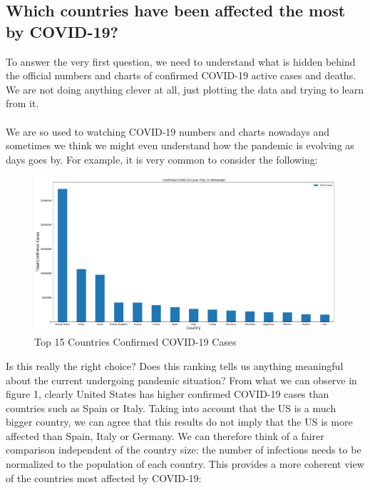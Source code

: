 \documentclass[11pt,a4paper]{article}
\begin{document}
\subsection{Which countries have been affected the most by COVID-19?}
To answer the very first question, we need to understand what is hidden behind
the official numbers and charts of confirmed COVID-19 active cases and deaths.
We are not doing anything clever at all, just plotting the data and trying to
learn from it.\\
\\
We are so used to watching COVID-19 numbers and charts nowadays and sometimes we
think we might even understand how the pandemic is evolving as days goes by. For
example, it is very common to consider the following:
\begin{figure}[H]
    \begin{center}
        \hspace*{-0.2cm}
        \includegraphics[scale=0.32]{img/total-cases.pdf}
    \end{center}
    \caption{Top 15 Countries Confirmed COVID-19 Cases}
\end{figure}
\noindent Is this really the right choice? Does this ranking tells us anything
meaningful about the current undergoing pandemic situation? From what we can
observe in figure 1, clearly United States has higher confirmed COVID-19 cases
than countries such as Spain or Italy. Taking into account that the US is a much
bigger country, we can agree that this results do not imply that the US is more
affected than Spain, Italy or Germany. We can therefore think of a fairer
comparison independent of the country size: the number of infections needs to be
normalized to the population of each country. This provides a more coherent view
of the countries most affected by COVID-19:
\end{document}
